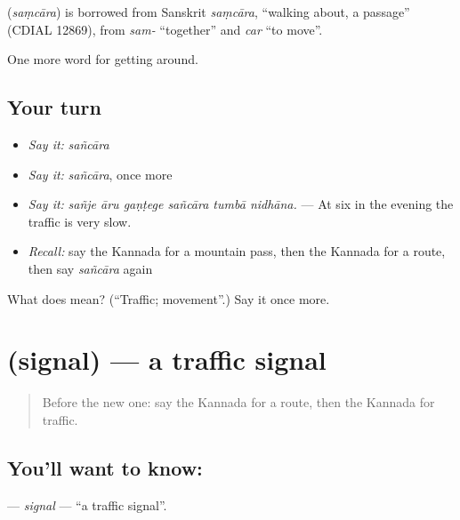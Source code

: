 \begin{cousinweb}
\textbf{} (\emph{saṃcāra}) is borrowed from Sanskrit \emph{saṃcāra}, \textquotedblleft{}walking about, a passage\textquotedblright{} (CDIAL 12869), from \emph{sam-} \textquotedblleft{}together\textquotedblright{} and \emph{car} \textquotedblleft{}to move\textquotedblright{}.
\end{cousinweb}

\begin{grammarlens}[title={What you've built}]
One more word for getting around.
\end{grammarlens}

\subsection*{Your turn}
\begin{itemize}
\raggedright
  \item \emph{Say it:} \emph{sañcāra}
  \item \emph{Say it:} \emph{sañcāra}, once more
  \item \emph{Say it:} \emph{sañje āru gaṇṭege sañcāra tumbā nidhāna.} — At six in the evening the traffic is very slow.
  \item \emph{Recall:} say the Kannada for a mountain pass, then the Kannada for a route, then say \emph{sañcāra} again
\end{itemize}

\begin{tcolorbox}[breakable,colback=teal!4,colframe=teal!35!black,title={Before you move on}]
What does  mean? (\textquotedblleft{}Traffic; movement\textquotedblright{}.) Say it once more.
\end{tcolorbox}
\section[\texorpdfstring{\kn{ಸಿಗ್ನಲ್} (signal)}{ಸಿಗ್ನಲ್ (signal)}]{ (signal) — a traffic signal}

\label{lesson:KA-C443-signal}



\begin{quote}
Before the new one: say the Kannada for a route, then the Kannada for traffic.
\end{quote}

\subsection*{You'll want to know: }
\textbf{} — \emph{signal} — \textquotedblleft{}a traffic signal\textquotedblright{}.

